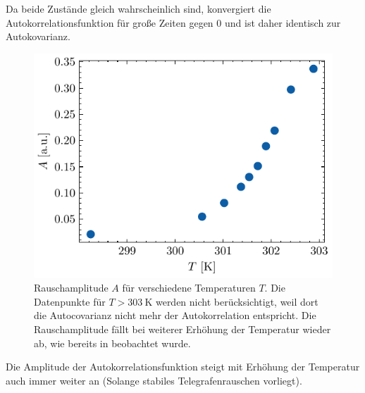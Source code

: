 \documentclass[main.tex]{subfiles}
\begin{document}
Da beide Zustände gleich wahrscheinlich sind, konvergiert die Autokorrelationsfunktion für große Zeiten gegen 0 und ist daher identisch zur Autokovarianz.

\begin{figure}[H]
    \centering
    \includegraphics{bilder/plots/temp_comparison_long/rauschamplitude.pdf}
    \caption[Rauschamplitude $A$ für verschiedene Temperaturen $T$.]{Rauschamplitude $A$ für verschiedene Temperaturen $T$. Die Datenpunkte für \(T > \SI{303}{\kelvin}\) werden nicht berücksichtigt, weil dort die Autocovarianz nicht mehr der Autokorrelation entspricht. 
    Die Rauschamplitude fällt bei weiterer Erhöhung der Temperatur wieder ab, wie bereits in \cite{schlegel-master} beobachtet wurde.}\label{fig:temp-autocorr-amplitude}
\end{figure}

Die Amplitude der Autokorrelationsfunktion steigt mit Erhöhung der Temperatur auch immer weiter an (Solange stabiles Telegrafenrauschen vorliegt).
\end{document}
